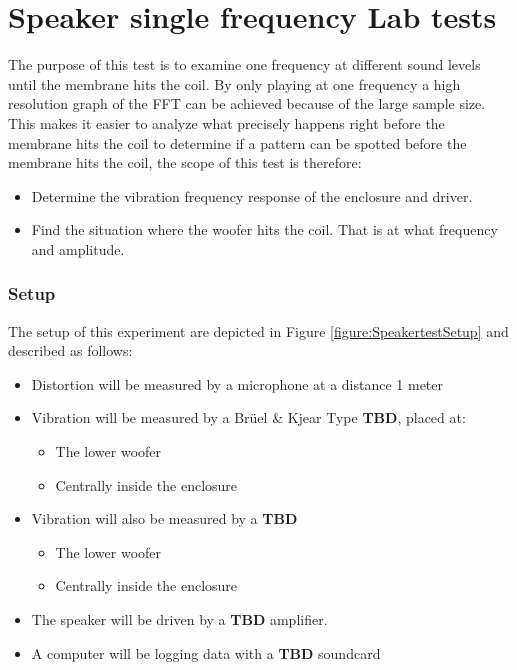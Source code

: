 \chapter{Speaker single frequency Lab tests} \label{app:journal_speaker_test}

The purpose of this test is to examine one frequency at different sound levels until the membrane hits the coil. By only playing at one frequency a high resolution graph of the FFT can be achieved because of the large sample size. This makes it easier to analyze what precisely happens right before the membrane hits the coil to determine if a pattern can be spotted before the membrane hits the coil, the scope of this test is therefore:

\begin{itemize}
\item Determine the vibration frequency response of the enclosure and driver.
\item Find the situation where the woofer hits the coil. That is at what frequency and amplitude.
\end{itemize}

\subsection{Setup}

The setup of this experiment are depicted in Figure \ref{figure:SpeakertestSetup} and described as follows:
\begin{itemize}
\item Distortion will be measured by a microphone at a distance 1 meter
\item Vibration will be measured by a Brüel \& Kjear Type \textbf{TBD}, placed at:
	\begin{itemize}
	\item The lower woofer
	\item Centrally inside the enclosure 
	\end{itemize}
\item Vibration will also be measured by a \textbf{TBD}
	\begin{itemize}
	\item The lower woofer
	\item Centrally inside the enclosure 
	\end{itemize}
\item The speaker will be driven by a \textbf{TBD} amplifier.
\item A computer will be logging data with a \textbf{TBD} soundcard
\end{itemize}

